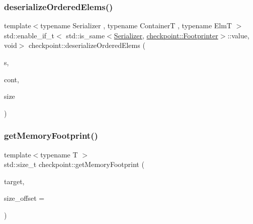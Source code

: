 \mbox{\label{namespacecheckpoint_a9976fffc8f39073e5b40ec61d93a5482}} 
\subsubsection{\texorpdfstring{deserialize\+Ordered\+Elems()}{deserializeOrderedElems()}\hspace{0.1cm}{\footnotesize\ttfamily [3/3]}}
{\footnotesize\ttfamily template$<$typename Serializer , typename ContainerT , typename ElmT $>$ \\
std\+::enable\+\_\+if\+\_\+t$<$ std\+::is\+\_\+same$<$\hyperlink{structcheckpoint_1_1_serializer}{Serializer}, \hyperlink{structcheckpoint_1_1_footprinter}{checkpoint\+::\+Footprinter}$>$\+::value, void$>$ checkpoint\+::deserialize\+Ordered\+Elems (\begin{DoxyParamCaption}\item[{\hyperlink{structcheckpoint_1_1_serializer}{Serializer} \&}]{s,  }\item[{ContainerT \&}]{cont,  }\item[{typename Container\+T\+::size\+\_\+type}]{size }\end{DoxyParamCaption})\hspace{0.3cm}{\ttfamily [inline]}}

\mbox{\label{namespacecheckpoint_a3c06c0dd0b9bccfd2aa6b79570b9cda1}} 
\subsubsection{\texorpdfstring{get\+Memory\+Footprint()}{getMemoryFootprint()}}
{\footnotesize\ttfamily template$<$typename T $>$ \\
std\+::size\+\_\+t checkpoint\+::get\+Memory\+Footprint (\begin{DoxyParamCaption}\item[{T \&}]{target,  }\item[{std\+::size\+\_\+t}]{size\+\_\+offset = {} }\end{DoxyParamCaption})}




